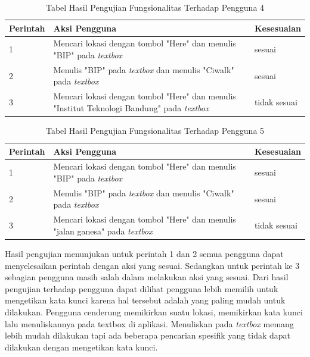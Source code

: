 \newpage

\begin{table}[h!]
	\centering
		\begin{tabular}{|p{}|p{9cm}|p{2cm}|}\hline
				Perintah & Aksi Pengguna & Kesesuaian \\ \hline
				1 & Mencari lokasi dengan tombol "Here" dan menulis "BIP" pada \textit{textbox} & sesuai \\ \hline
				2 & Menulis "BIP" pada \textit{textbox} dan menulis "Ciwalk" pada \textit{textbox} & sesuai \\ \hline
				3 & Mencari lokasi dengan tombol "Here" dan menulis "Institut Teknologi Bandung" pada \textit{textbox} & tidak sesuai \\ \hline
		\end{tabular}
	\caption{Tabel Hasil Pengujian Fungsionalitas Terhadap Pengguna 4}
	\label{tab:TabelHasilPengujianFungsionalitasTerhadapPengguna}
\end{table}

\begin{table}[h!]
	\centering
		\begin{tabular}{|p{}|p{9cm}|p{2cm}|}\hline
				Perintah & Aksi Pengguna & Kesesuaian \\ \hline
				1 & Mencari lokasi dengan tombol "Here" dan menulis "BIP" pada \textit{textbox} & sesuai \\ \hline
				2 & Menulis "BIP" pada \textit{textbox} dan menulis "Ciwalk" pada \textit{textbox} & sesuai \\ \hline
				3 & Mencari lokasi dengan tombol "Here" dan menulis "jalan ganesa" pada \textit{textbox} & tidak sesuai \\ \hline
		\end{tabular}
	\caption{Tabel Hasil Pengujian Fungsionalitas Terhadap Pengguna 5}
	\label{tab:TabelHasilPengujianFungsionalitasTerhadapPengguna}
\end{table}

\hspace{0.5cm} Hasil pengujian menunjukan untuk perintah 1 dan 2 semua pengguna dapat menyelesaikan perintah dengan aksi yang sesuai. Sedangkan untuk perintah ke 3 sebagian pengguna masih salah dalam melakukan aksi yang sesuai. Dari hasil pengujian terhadap pengguna dapat dilihat pengguna lebih memilih untuk mengetikan kata kunci karena hal tersebut adalah yang paling mudah untuk dilakukan. Pengguna cenderung memikirkan suatu lokasi, memikirkan kata kunci lalu menuliskannya pada textbox di aplikasi. Menuliskan pada \textit{textbox} memang lebih mudah dilakukan tapi ada beberapa pencarian spesifik yang tidak dapat dilakukan dengan mengetikan kata kunci.   

